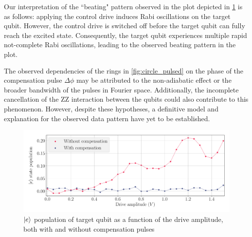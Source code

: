Our interpretation of the “beating" pattern observed in the plot depicted in \cref{fig:Rabi_canc_pulsed} is as follows: applying the control drive induces Rabi oscillations on the target qubit.
However, the control drive is switched off before the target qubit can fully reach the excited state.
Consequently, the target qubit experiences multiple rapid not-complete Rabi oscillations, leading to the observed beating pattern in the plot.

The observed dependencies of the rings in \cref{fig:circle_pulsed} on the phase of the compensation pulse $\Delta \phi$ may be attributed to the non-adiabatic effect or the broader bandwidth of the pulses in Fourier space. 
Additionally, the incomplete cancellation of the ZZ interaction between the qubits could also contribute to this phenomenon.
However, despite these hypotheses, a definitive model and explanation for the observed data pattern have yet to be established.

\begin{figure}
    \centering
    \includegraphics[width=0.75\linewidth]{Images//Chap2.0/Rabi_pulsed_cancellation.pdf}
    \caption{$\ket{e}$ population of target qubit as a function of the drive amplitude, both with and without compensation pulses}
    \label{fig:Rabi_canc_pulsed}
\end{figure}